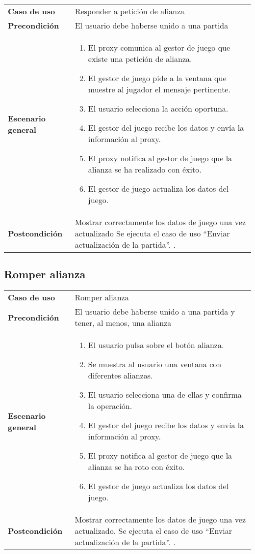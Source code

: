 {\footnotesize
\begin{tabularx}{0.95\textwidth}{p{}|X}
\textbf{Caso de uso} & Responder a petición de alianza \\

\textbf{Precondición} & El usuario debe haberse unido a una partida \\

\textbf{Escenario general} & \begin{enumerate}
\item El proxy comunica al gestor de juego que existe una petición de alianza.
\item El gestor de juego pide a la ventana que muestre al jugador el mensaje
pertinente.
\item El usuario selecciona la acción oportuna.
\item El gestor del juego recibe los datos y envía la información al proxy.
\item El proxy notifica al gestor de juego que la alianza se ha realizado con
éxito.
\item El gestor de juego actualiza los datos del juego.
\end{enumerate} \\
\textbf{Postcondición} & Mostrar correctamente los datos de juego una vez
actualizado Se ejecuta el caso de uso  ``Enviar actualización de
la partida''. .
\end{tabularx}
}

\subsection{Romper alianza}

{\footnotesize
\begin{tabularx}{0.95\textwidth}{p{}|X}

\textbf{Caso de uso} & Romper alianza \\

\textbf{Precondición} & El usuario debe haberse unido a una partida y tener, al
menos, una alianza \\

\textbf{Escenario general} & \begin{enumerate}
\item El usuario pulsa sobre el botón alianza.
\item Se muestra al usuario una ventana con diferentes alianzas.
\item El usuario selecciona una de ellas y confirma la operación.
\item El gestor del juego recibe los datos y envía la información al proxy.
\item El proxy notifica al gestor de juego que la alianza se ha roto con éxito.
\item El gestor de juego actualiza los datos del juego.
\end{enumerate} \\

\textbf{Postcondición} & Mostrar correctamente los datos de juego una vez
actualizado. Se ejecuta el caso de uso  ``Enviar actualización de
la partida''. .

\end{tabularx}
}


